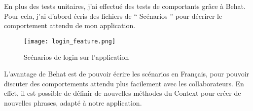 En plus des tests unitaires, j'ai effectué des tests de comportants grâce à Behat. Pour cela, j'ai d'abord écris des fichiers de `` Scénarios '' pour décrirer le comportement attendu de mon application.

\begin{figure}[h]
\begin{center}
\texttt{[image: login\_feature.png]}
\end{center}
\caption{Scénarios de login sur l'application}
\end{figure}

L'avantage de Behat est de pouvoir écrire les scénarios en Français, pour pouvoir discuter des comportements attendu plus facilement avec les collaborateurs. En effet, il est possible de définir de nouvelles méthodes du Context pour créer de nouvelles phrases, adapté à notre application.